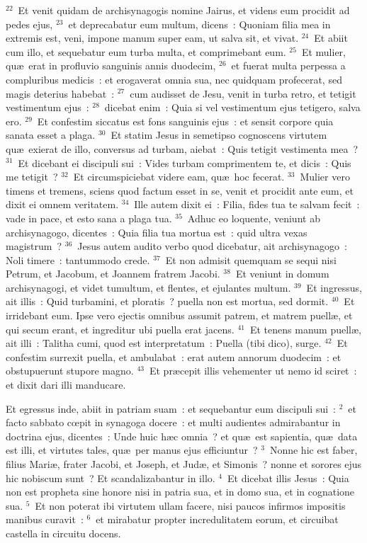 ${}^{22}$~Et venit quidam de archisynagogis nomine Jairus, et videns eum procidit ad pedes ejus,
${}^{23}$~et deprecabatur eum multum, dicens~: Quoniam filia mea in extremis est, veni, impone manum super eam, ut salva sit, et vivat.
${}^{24}$~Et abiit cum illo, et sequebatur eum turba multa, et comprimebant eum.
${}^{25}$~Et mulier, qu\ae\ erat in profluvio sanguinis annis duodecim,
${}^{26}$~et fuerat multa perpessa a compluribus medicis~: et erogaverat omnia sua, nec quidquam profecerat, sed magis deterius habebat~:
${}^{27}$~cum audisset de Jesu, venit in turba retro, et tetigit vestimentum ejus~:
${}^{28}$~dicebat enim~: Quia si vel vestimentum ejus tetigero, salva ero.
${}^{29}$~Et confestim siccatus est fons sanguinis ejus~: et sensit corpore quia sanata esset a plaga.
${}^{30}$~Et statim Jesus in semetipso cognoscens virtutem qu\ae\ exierat de illo, conversus ad turbam, aiebat~: Quis tetigit vestimenta mea~?
${}^{31}$~Et dicebant ei discipuli sui~: Vides turbam comprimentem te, et dicis~: Quis me tetigit~?
${}^{32}$~Et circumspiciebat videre eam, qu\ae\ hoc fecerat.
${}^{33}$~Mulier vero timens et tremens, sciens quod factum esset in se, venit et procidit ante eum, et dixit ei omnem veritatem.
${}^{34}$~Ille autem dixit ei~: Filia, fides tua te salvam fecit~: vade in pace, et esto sana a plaga tua.
${}^{35}$~Adhuc eo loquente, veniunt ab archisynagogo, dicentes~: Quia filia tua mortua est~: quid ultra vexas magistrum~?
${}^{36}$~Jesus autem audito verbo quod dicebatur, ait archisynagogo~: Noli timere~: tantummodo crede.
${}^{37}$~Et non admisit quemquam se sequi nisi Petrum, et Jacobum, et Joannem fratrem Jacobi.
${}^{38}$~Et veniunt in domum archisynagogi, et videt tumultum, et flentes, et ejulantes multum.
${}^{39}$~Et ingressus, ait illis~: Quid turbamini, et ploratis~? puella non est mortua, sed dormit.
${}^{40}$~Et irridebant eum. Ipse vero ejectis omnibus assumit patrem, et matrem puell\ae , et qui secum erant, et ingreditur ubi puella erat jacens.
${}^{41}$~Et tenens manum puell\ae , ait illi~: Talitha cumi, quod est interpretatum~: Puella (tibi dico), surge.
${}^{42}$~Et confestim surrexit puella, et ambulabat~: erat autem annorum duodecim~: et obstupuerunt stupore magno.
${}^{43}$~Et pr\ae cepit illis vehementer ut nemo id sciret~: et dixit dari illi manducare.

\lettrine[lines=3,image=true,loversize=0.05,lraise=-0.03]{E}{}t egressus inde, abiit in patriam suam~: et sequebantur eum discipuli sui~:
${}^{2}$~et facto sabbato cœpit in synagoga docere~: et multi audientes admirabantur in doctrina ejus, dicentes~: Unde huic h\ae c omnia~? et qu\ae\ est sapientia, qu\ae\ data est illi, et virtutes tales, qu\ae\ per manus ejus efficiuntur~?
${}^{3}$~Nonne hic est faber, filius Mari\ae , frater Jacobi, et Joseph, et Jud\ae , et Simonis~? nonne et sorores ejus hic nobiscum sunt~? Et scandalizabantur in illo.
${}^{4}$~Et dicebat illis Jesus~: Quia non est propheta sine honore nisi in patria sua, et in domo sua, et in cognatione sua.
${}^{5}$~Et non poterat ibi virtutem ullam facere, nisi paucos infirmos impositis manibus curavit~:
${}^{6}$~et mirabatur propter incredulitatem eorum, et circuibat castella in circuitu docens.


